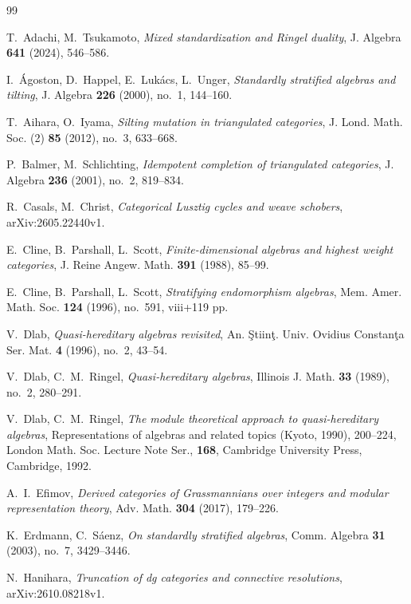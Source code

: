\documentclass[a4paper,reqno,11pt]{amsart}
\numberwithin{equation}{section}
\theoremstyle{definition}
\begin{document}
\begin{thebibliography}{99}

 T.~Adachi, M.~Tsukamoto, \emph{Mixed standardization and Ringel duality}, J. Algebra \textbf{641} (2024), 546--586.

 I.~\'Agoston, D.~Happel, E.~Luk\'acs, L.~Unger, \emph{Standardly stratified algebras and tilting}, J. Algebra \textbf{226} (2000), no.~1, 144--160.

 T.~Aihara, O.~Iyama, \emph{Silting mutation in triangulated categories}, J. Lond. Math. Soc. (2) \textbf{85} (2012), no.~3, 633--668.

 P.~Balmer, M.~Schlichting, \emph{Idempotent completion of triangulated categories}, J. Algebra \textbf{236} (2001), no.~2, 819--834.

 R.~Casals, M.~Christ, \emph{Categorical Lusztig cycles and weave schobers}, arXiv:2605.22440v1.

 E.~Cline, B.~Parshall, L.~Scott, \emph{Finite-dimensional algebras and highest weight categories}, J. Reine Angew. Math. \textbf{391} (1988), 85--99.

 E.~Cline, B.~Parshall, L.~Scott, \emph{Stratifying endomorphism algebras}, Mem. Amer. Math. Soc. \textbf{124} (1996), no.~591, viii+119 pp.

 V.~Dlab, \emph{Quasi-hereditary algebras revisited}, An. \c{S}tiin\c{t}. Univ. Ovidius Constan\c{t}a Ser. Mat. \textbf{4} (1996), no.~2, 43--54.

 V.~Dlab, C.~M.~Ringel, \emph{Quasi-hereditary algebras}, Illinois J. Math. \textbf{33} (1989), no.~2, 280--291.

 V.~Dlab, C.~M.~Ringel, \emph{The module theoretical approach to quasi-hereditary algebras}, Representations of algebras and related topics (Kyoto, 1990), 200--224, London Math. Soc. Lecture Note Ser., \textbf{168}, Cambridge University Press, Cambridge, 1992.

 A.~I.~Efimov, \emph{Derived categories of Grassmannians over integers and modular representation theory}, Adv. Math. \textbf{304} (2017), 179--226.

 K.~Erdmann, C.~S\'aenz, \emph{On standardly stratified algebras}, Comm. Algebra \textbf{31} (2003), no.~7, 3429--3446.

 N.~Hanihara, \emph{Truncation of dg categories and connective resolutions}, arXiv:2610.08218v1.


\end{thebibliography}
\end{document}

